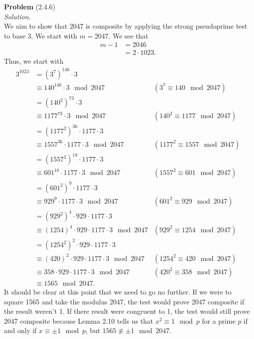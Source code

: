 \documentclass[12 pt]{amsart}
\begin{document}
\phantom{\quad} \vfill
\noindent
\textbf{Problem} (2.4.6) \\[4ex]
\emph{Solution.} \\[2ex]
  We aim to show that 2047 is composite by applying the strong
  pseudoprime test to base 3. 
  We start with $m = 2047$. 
  We see that 
  \begin{align*}
    m - 1 &= 2046 \\
          &= 2 \cdot 1023.
  \end{align*}
  Thus, we start with 
  \begin{align*}
    3^{1023} &= \left( 3^7 \right)^{146} \cdot 3 \\
             &\equiv 140^{146} \cdot 3 \mod 2047 & (3^7 \equiv 140 \mod 2047) \\
             &=\left( 140^2 \right)^{73} \cdot 3 \\
             &\equiv 1177^{73} \cdot 3 \mod 2047 & (140^2 \equiv 1177 \mod 2047) \\
             &= \left( 1177^2 \right)^{36} \cdot 1177 \cdot 3 \\
             &\equiv 1557^{36} \cdot 1177 \cdot 3 \mod 2047 & (1177^2 \equiv 1557 \mod 2047) \\
             &= \left( 1557^2 \right)^{18} \cdot 1177 \cdot 3 \\
             &\equiv 601^{18} \cdot 1177 \cdot 3 \mod 2047 & (1557^2 \equiv 601 \mod 2047) \\ 
             &= \left( 601^2 \right)^9 \cdot 1177 \cdot 3 \\
             &\equiv 929^{9} \cdot 1177 \cdot 3 \mod 2047 & (601^2 \equiv 929 \mod 2047) \\ 
             &= \left( 929^2 \right)^4 \cdot 929 \cdot 1177 \cdot 3 \\
             &\equiv \left( 1254 \right)^4 \cdot 929 \cdot 1177 \cdot 3 \mod 2047 & (929^2 \equiv 1254 \mod 2047) \\
             &= \left( 1254^2 \right)^2 \cdot 929 \cdot 1177 \cdot 3 \\
             &\equiv \left( 420 \right)^2 \cdot 929 \cdot 1177 \cdot 3 \mod 2047 & (1254^2 \equiv 420 \mod 2047) \\
             &\equiv 358 \cdot 929 \cdot 1177 \cdot 3 \mod 2047 & (420^2 \equiv 358 \mod 2047) \\
             &\equiv 1565 \mod 2047.
  \end{align*}
  It should be clear at this point that we need to go no further. 
  If we were to square 1565 and take the modulus 2047, the test would
  prove 2047 composite if the result weren't 1. 
  If there result were congruent to 1, the test would still prove 2047
  composite because Lemma 2.10 tells us that $x^2 \equiv 1 \mod p$ for 
  a prime $p$ if and only if $x \equiv \pm 1 \mod p$, but 
  $1565 \not \equiv \pm 1 \mod 2047$.
\vfill
\newpage
\end{document}
